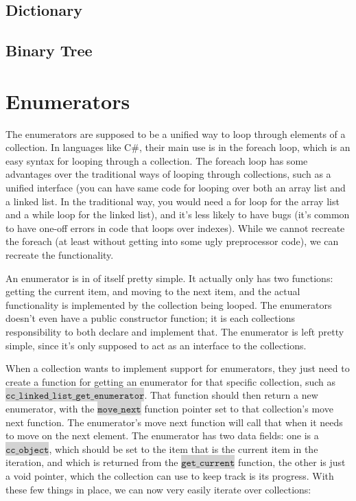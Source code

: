 \documentclass[table]{ituthesis}
\newcommand{\highlight}[1]{\colorbox{lightGray}{$\displaystyle \texttt{#1}$}}
\begin{document}
	\subsection{Dictionary}
	\subsection{Binary Tree}
\section{Enumerators}

	The enumerators are supposed to be a unified way to loop through elements of a collection. In languages like C\#, their main use is in the foreach loop, which is an easy syntax for looping through a collection. The foreach loop has some advantages over the traditional ways of looping through collections, such as a unified interface (you can have same code for looping over both an array list and a linked list. In the traditional way, you would need a for loop for the array list and a while loop for the linked list), and it's less likely to have bugs (it's common to have one-off errors in code that loops over indexes). While we cannot recreate the foreach (at least without getting into some ugly preprocessor code), we can recreate the functionality.

	An enumerator is in of itself pretty simple. It actually only has two functions: getting the current item, and moving to the next item, and the actual functionality is implemented by the collection being looped. The enumerators doesn't even have a public constructor function; it is each collections responsibility to both declare and implement that. The enumerator is left pretty simple, since it's only supposed to act as an interface to the collections.

	When a collection wants to implement support for enumerators, they just need to create a function for getting an enumerator for that specific collection, such as \highlight{cc\_linked\_list\_get\_enumerator}. That function should then return a new enumerator, with the \highlight{move\_next} function pointer set to that collection's move next function. The enumerator's move next function will call that when it needs to move on the next element. The enumerator has two data fields: one is a \highlight{cc\_object}, which should be set to the item that is the current item in the iteration, and which is returned from the \highlight{get\_current} function, the other is just a void pointer, which the collection can use to keep track is its progress. With these few things in place, we can now very easily iterate over collections:
\end{document}
